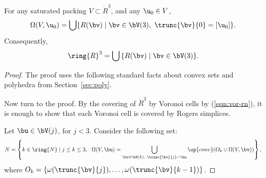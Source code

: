 \begin{lemma} 
For any saturated packing $V\subset\ring{R}^3$, and any $\u_0\in V$,
\begin{equation} 
\Omega(V,\u_0) = \bigcup \{ R(\bv) \mid \bv\in \bV(3),~\trunc{\bv}{0} =[\u_0]\}.
\end{equation}
Consequently,
\begin{displaymath}
\ring{R}^3 = \bigcup\, \{ R(\bv) \mid \bv\in\bV(3)\}.
\end{displaymath}
\end{lemma}

\begin{proof} 
The proof uses the following standard facts about convex sets and polyhedra from
Section~\ref{sec:poly}.


%
Now turn to the proof.  
By the covering of $\ring{R}^3$  by Voronoi cells by (\ref{eqn:vor-rn}),
it is enough to show that each Voronoi cell is covered by Rogers simplices.

Let $\bu\in \bV(j)$, for $j<3$.
Consider the following set:
\begin{displaymath} 
N = \left\{k\in\ring{N}\mid j\le k\le 3, ~~\Omega(V,\bu) 
= \bigcup_{\bv \in \bV(k),~\trunc{\bv}{j}=\bu}
\op{conv}(O_k \cup\Omega(V,\bv)) %
\right\},
\end{displaymath}
where $O_k = \{\omega(\trunc{\bv}{j}),\ldots,\omega(\trunc{\bv}{k-1})\}$.


\end{proof}
